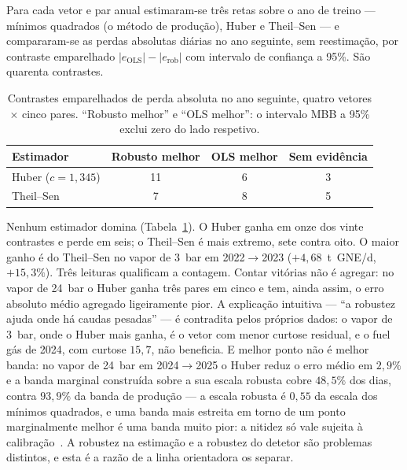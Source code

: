 Para cada vetor e par anual estimaram-se três retas sobre o ano de treino
--- mínimos quadrados (o método de produção), Huber e Theil--Sen --- e
compararam-se as perdas absolutas diárias no ano seguinte, sem reestimação,
por contraste emparelhado $|e_{\mathrm{OLS}}| - |e_{\mathrm{rob}}|$ com
intervalo de confiança a 95\%. São quarenta contrastes.

\begin{table}[htbp]
  \centering
  \caption[Estimadores robustos contra mínimos quadrados]{Contrastes
  emparelhados de perda absoluta no ano seguinte, quatro vetores $\times$
  cinco pares. ``Robusto melhor'' e ``OLS melhor'': o intervalo MBB a 95\%
  exclui zero do lado respetivo.}
  \label{tab:robustos}
  \begin{tabular}{lccc}
    \toprule
    Estimador & Robusto melhor & OLS melhor & Sem evidência \\
    \midrule
    Huber ($c = 1{,}345$) & 11 & 6 & 3 \\
    Theil--Sen            & 7  & 8 & 5 \\
    \bottomrule
  \end{tabular}
\end{table}

Nenhum estimador domina (Tabela~\ref{tab:robustos}). O Huber ganha em onze
dos vinte contrastes e perde em seis; o Theil--Sen é mais extremo, sete
contra oito. O maior ganho é do Theil--Sen no vapor de 3~bar em
2022${\to}$2023 ($+4{,}68$~t~GNE/d, $+15{,}3\%$). Três leituras
qualificam a contagem. Contar vitórias não é agregar: no vapor de 24~bar o
Huber ganha três pares em cinco e tem, ainda assim, o erro absoluto médio
agregado ligeiramente pior. A explicação intuitiva --- ``a robustez ajuda
onde há caudas pesadas'' --- é contradita pelos próprios dados: o vapor de
3~bar, onde o Huber mais ganha, é o vetor com menor curtose residual, e o
fuel gás de 2024, com curtose $15{,}7$, não beneficia. E melhor ponto não é
melhor banda: no vapor de 24~bar em 2024${\to}$2025 o Huber reduz o erro
médio em $2{,}9\%$ e a banda marginal construída sobre a sua escala robusta
cobre $48{,}5\%$ dos dias, contra $93{,}9\%$ da banda de produção --- a
escala robusta é $0{,}55$ da escala dos mínimos quadrados, e uma banda mais
estreita em torno de um ponto marginalmente melhor é uma banda muito pior:
a nitidez só vale sujeita à calibração~\cite{Gneiting2007}.
A robustez na estimação e a robustez do detetor são problemas distintos, e
esta é a razão de a linha orientadora os separar.

